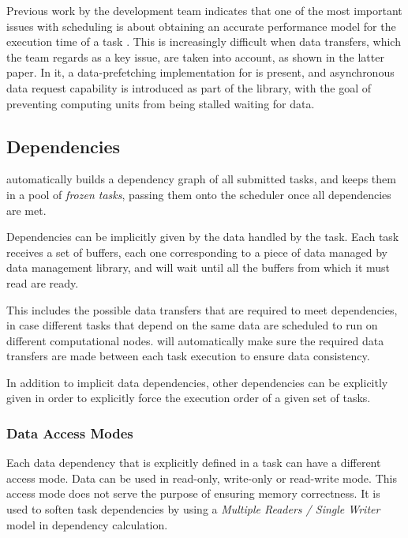 \documentclass[main.tex]{subfiles}
\begin{document}
Previous work by the \starpu development team indicates that one of the most important issues with scheduling is about obtaining an accurate performance model for the execution time of a task \cite{augonnet2010data,augonnet2010automatic}. This is increasingly difficult when data transfers, which the team regards as a key issue, are taken into account, as shown in the latter paper. In it, a data-prefetching implementation for \gpus is present, and asynchronous data request capability is introduced as part of the \starpu library, with the goal of preventing computing units from being stalled waiting for data.

\subsection{Dependencies}

\starpu automatically builds a dependency graph of all submitted tasks, and keeps them in a pool of \emph{frozen tasks}, passing them onto the scheduler once all dependencies are met.

Dependencies can be implicitly given by the data handled by the task. Each task receives a set of buffers, each one corresponding to a piece of data managed by \starpu data management library, and will wait until all the buffers from which it must read are ready.

This includes the possible data transfers that are required to meet dependencies, in case different tasks that depend on the same data are scheduled to run on different computational nodes. \starpu will automatically make sure the required data transfers are made between each task execution to ensure data consistency.

In addition to implicit data dependencies, other dependencies can be explicitly given in order to explicitly force the execution order of a given set of tasks.

\subsubsection{Data Access Modes} \label{sec:starpu:data_access}

Each data dependency that is explicitly defined in a task can have a different access mode. Data can be used in read-only, write-only or read-write mode. This access mode does not serve the purpose of ensuring memory correctness. It is used to soften task dependencies by using a \emph{Multiple Readers / Single Writer} model in dependency calculation.
\end{document}
